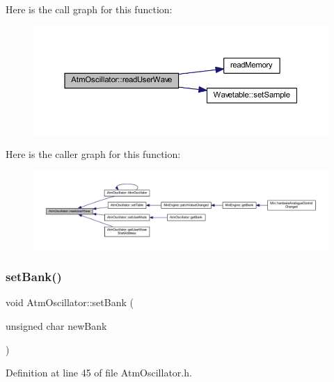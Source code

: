 Here is the call graph for this function\+:
\nopagebreak
\begin{figure}[H]
\begin{center}
\leavevmode
\includegraphics[width=350pt]{class_atm_oscillator_a08b383cd2305c232de827399aa8d2ccb_cgraph}
\end{center}
\end{figure}
Here is the caller graph for this function\+:
\nopagebreak
\begin{figure}[H]
\begin{center}
\leavevmode
\includegraphics[width=350pt]{class_atm_oscillator_a08b383cd2305c232de827399aa8d2ccb_icgraph}
\end{center}
\end{figure}
\mbox{\label{class_atm_oscillator_a9f65ae9f2132c46f73b776a869b5bf21}} 
\subsubsection{\texorpdfstring{set\+Bank()}{setBank()}}
{\footnotesize\ttfamily void Atm\+Oscillator\+::set\+Bank (\begin{DoxyParamCaption}\item[{unsigned char}]{new\+Bank }\end{DoxyParamCaption})\hspace{0.3cm}{\ttfamily [inline]}}



Definition at line 45 of file Atm\+Oscillator.\+h.

